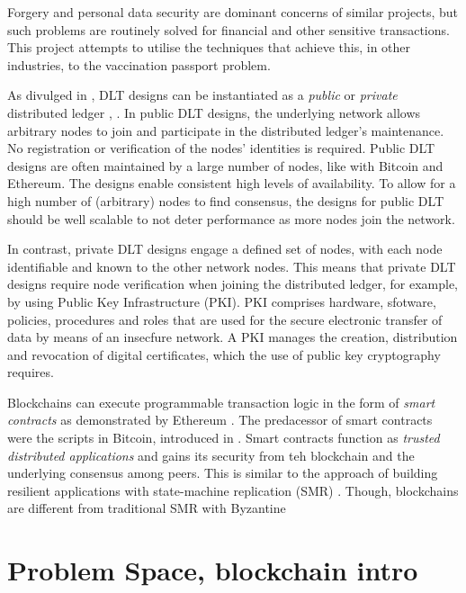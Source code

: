 Forgery and personal data security are dominant concerns of similar projects, but such problems are routinely solved for financial and other sensitive transactions. \cite{dye_covid-19_2021}
This project attempts to utilise the techniques that achieve this, in other industries, to the vaccination passport problem. %

As divulged in \cite{sunyaev_distributed_2020}, DLT designs can be instantiated as a \emph{public} or \emph{private} distributed ledger \cite{yeow_decentralized_2018}, \cite{xu_taxonomy_2017}.
In public DLT designs, the underlying network allows arbitrary nodes to join and participate in the distributed ledger's maintenance. No registration or verification of the nodes' identities is required.
Public DLT designs are often maintained by a large number of nodes, like with Bitcoin and Ethereum. The designs enable consistent high levels of availability. 
To allow for a high number of (arbitrary) nodes to find consensus, the designs for public DLT should be well scalable to not deter performance as more nodes join the network. \cite{sunyaev_distributed_2020}

In contrast, private DLT designs engage a defined set of nodes, with each node identifiable and known to the other network nodes. This means that private DLT designs require node verification when joining the distributed ledger, for example, by using Public Key Infrastructure (PKI).
PKI comprises hardware, sfotware, policies, procedures and roles that are used for the secure electronic transfer of data by means of an insecfure network. A PKI manages the creation, distribution and revocation of digital certificates, which the use of public key cryptography requires. \cite{sunyaev_distributed_2020}

Blockchains can execute programmable transaction logic in the form of \emph{smart contracts} as demonstrated by Ethereum \cite{noauthor_ethereum_nodate}.
The predacessor of smart contracts were the scripts in Bitcoin, introduced in \cite{nakamoto_bitcoin_2019}.
Smart contracts function as \emph{trusted distributed applications} and gains its security from teh blockchain and the underlying consensus among peers.
This is similar to the approach of building resilient applications with state-machine replication (SMR) \cite{schneider_implementing_1990}.
Though, blockchains are different from traditional SMR with Byzantine 

\section{Problem Space, blockchain intro } %

